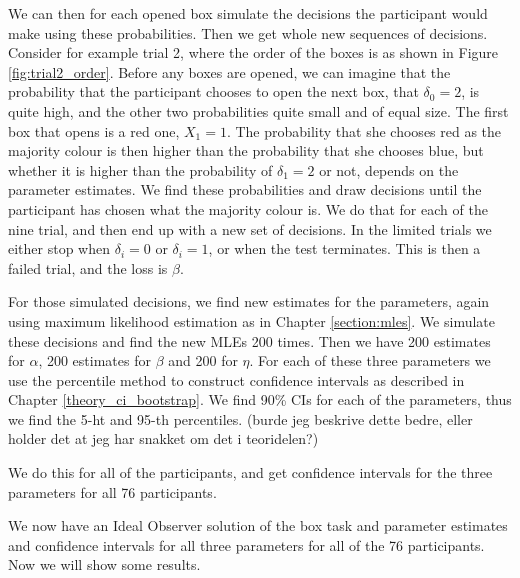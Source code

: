 We can then for each opened box simulate the decisions the participant would make using these probabilities. Then we get whole new sequences of decisions. Consider for example trial 2, where the order of the boxes is as shown in Figure \ref{fig:trial2_order}. Before any boxes are opened, we can imagine that the probability that the participant chooses to open the next box, that $\delta_0=2$, is quite high, and the other two probabilities quite small and of equal size. The first box that opens is a red one, $X_1=1$. The probability that she chooses red as the majority colour is then higher than the probability that she chooses blue, but whether it is higher than the probability of $\delta_1=2$ or not, depends on the parameter estimates. We find these probabilities and draw decisions until the participant has chosen what the majority colour is. We do that for each of the nine trial, and then end up with a new set of decisions. In the limited trials we either stop when $\delta_i=0$ or $\delta_i=1$, or when the test terminates. This is then a failed trial, and the loss is $\beta$. 

For those simulated decisions, we find new estimates for the parameters, again using maximum likelihood estimation as in Chapter \ref{section:mles}. We simulate these decisions and find the new MLEs 200 times. Then we have 200 estimates for $\alpha$, 200 estimates for $\beta$ and 200 for $\eta$. For each of these three parameters we use the percentile method to construct confidence intervals as described in Chapter \ref{theory_ci_bootstrap}. We find 90\% CIs for each of the parameters, thus we find the 5-ht and 95-th percentiles. (burde jeg beskrive dette bedre, eller holder det at jeg har snakket om det i teoridelen?) 

We do this for all of the participants, and get confidence intervals for the three parameters for all 76 participants. 

We now have an Ideal Observer solution of the box task and parameter estimates and confidence intervals for all three parameters for all of the 76 participants. Now we will show some results.